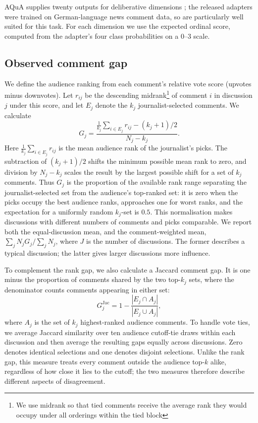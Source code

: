 AQuA supplies twenty outputs for deliberative dimensions \citep{Behrendt2024}; the released adapters were trained on German-language news comment data, so are particularly well suited for this task. For each dimension we use the expected ordinal score, computed from the adapter's four class probabilities on a 0--3 scale.



\subsection{Observed comment gap}
We define the audience ranking from each comment's relative vote score (upvotes minus downvotes). Let $r_{ij}$ be the descending midrank\footnote{We use midrank so that tied comments receive the average rank they would occupy under all orderings within the tied block} of comment $i$ in discussion $j$ under this score, and let $E_j$ denote the $k_j$ journalist-selected comments. We calculate
\begin{equation}
G_j=\frac{\frac{1}{k_j}\sum_{i\in E_j}r_{ij}-(k_j+1)/2}{N_j-k_j}.
\label{eq:gap}
\end{equation}
Here $\frac{1}{k_j}\sum_{i\in E_j}r_{ij}$ is the mean audience rank of the journalist's picks. The subtraction of $(k_j+1)/2$ shifts the minimum possible mean rank to zero, and division by $N_j-k_j$ scales the result by the largest possible shift for a set of $k_j$ comments. Thus $G_j$ is the proportion of the available rank range separating the journalist-selected set from the audience's top-ranked set: it is zero when the picks occupy the best audience ranks, approaches one for worst ranks, and the expectation for a uniformly random $k_j$-set is $0.5$. This normalisation makes discussions with different numbers of comments and picks comparable. We report both the equal-discussion mean, and the comment-weighted mean, $\sum_jN_jG_j/\sum_jN_j$, where $J$ is the number of discussions. The former describes a typical discussion; the latter gives larger discussions more influence.

To complement the rank gap, we also calculate a Jaccard comment gap. It is one minus the proportion of comments shared by the two top-$k_j$ sets, where the denominator counts comments appearing in either set:
\begin{equation}
G^{\mathrm{Jac}}_j=1-\frac{|E_j\cap A_j|}{|E_j\cup A_j|},
\end{equation}
where $A_j$ is the set of $k_j$ highest-ranked audience comments. To handle vote ties, we average Jaccard similarity over ten audience cutoff-tie draws within each discussion and then average the resulting gaps equally across discussions. Zero denotes identical selections and one denotes disjoint selections. Unlike the rank gap, this measure treats every comment outside the audience top-$k$ alike, regardless of how close it lies to the cutoff; the two measures therefore describe different aspects of disagreement.

